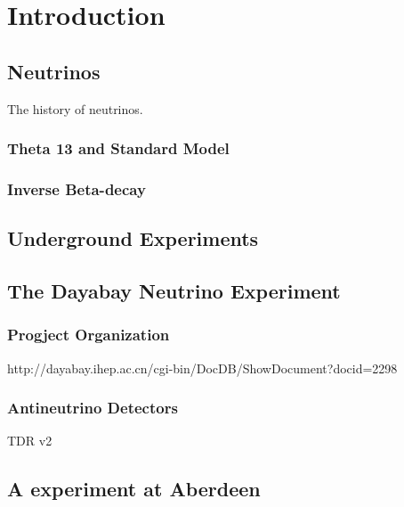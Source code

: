 
\chapter{Introduction}

\section{Neutrinos}

The history of neutrinos.

\subsection{Theta 13 and Standard Model}

\subsection{Inverse Beta-decay}

\section{Underground Experiments}

\section{The Dayabay Neutrino Experiment}

\subsection{Progject Organization}

http://dayabay.ihep.ac.cn/cgi-bin/DocDB/ShowDocument?docid=2298

\subsection{Antineutrino Detectors}

TDR v2

\section{A experiment at Aberdeen}
